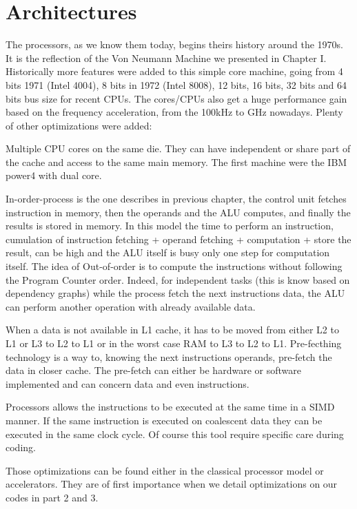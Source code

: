 \section{Architectures}
The processors, as we know them today, begins theirs history around the 1970s.
It is the reflection of the Von Neumann Machine we presented in Chapter I. 
Historically more features were added to this simple core machine, going from 4 bits 1971 (Intel 4004), 8 bits in 1972 (Intel 8008), 12 bits, 16 bits, 32 bits and 64 bits bus size for recent CPUs. 
The cores/CPUs also get a huge performance gain based on the frequency acceleration, from the 100kHz to GHz nowadays. 
Plenty of other optimizations were added:
\begin{description}
	\item[Multiple CPU cores:] Multiple CPU cores on the same die. They can have independent or share part of the cache and access to the same main memory. The first machine were the IBM power4 with dual core.
	\item[In/Out-Of-Order:] In-order-process is the one describes in previous chapter, the control unit fetches instruction in memory, then the operands and the ALU computes, and finally the results is stored in memory. 
	In this model the time to perform an instruction, cumulation of instruction fetching + operand fetching + computation + store the result, can be high and the ALU itself is busy only one step for computation itself. The idea of Out-of-order is to compute the instructions without following the Program Counter order. Indeed, for independent tasks (this is know based on dependency graphs) while the process fetch the next instructions data, the ALU can perform another operation with already available data. 
	\item[Pre-fetching:] When a data is not available in L1 cache, it has to be moved from either L2 to L1 or L3 to L2 to L1 or in the worst case RAM to L3 to L2 to L1. Pre-fecthing technology is a way to, knowing the next instructions operands, pre-fetch the data in closer cache. The pre-fetch can either be hardware or software implemented and can concern data and even instructions.
	\item[Vectorization:] Processors allows the instructions to be executed at the same time in a SIMD manner. If the same instruction is executed on coalescent data they can be executed in the same clock cycle. 
	Of course this tool require specific care during coding. 
\end{description}
Those optimizations can be found either in the classical processor model or accelerators.  
They are of first importance when we detail optimizations on our codes in part 2 and 3. 

